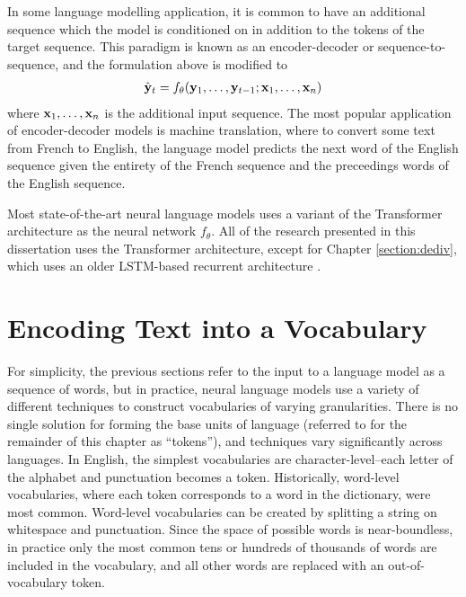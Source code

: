 In some language modelling application, it is common to have an additional sequence which the model is conditioned on in addition to the tokens of the target sequence.
This paradigm is known as an encoder-decoder or sequence-to-sequence, and the formulation above is modified to
\begin{align}
    \hat{\mathbf{y}}_t = f_\theta(\mathbf{y}_1, \ldots, \mathbf{y}_{t-1}; \mathbf{x}_1, \ldots, \mathbf{x}_n)
    \label{eq:cond_lm_feq}
\end{align}
where $\mathbf{x}_1, \ldots, \mathbf{x}_n$ is the additional input sequence. 
The most popular application of encoder-decoder models is machine translation, where to convert some text from French to English, the language model predicts the next word of the English sequence given the entirety of the French sequence and the preceedings words of the English sequence.

Most state-of-the-art neural language models uses a variant of the Transformer architecture \cite{vaswani2017attention} as the neural network $f_\theta$.
All of the research presented in this dissertation uses the Transformer architecture, except for Chapter \ref{section:dediv}, which uses an older LSTM-based recurrent architecture \citep{hochreiter1997long}.

\section{Encoding Text into a Vocabulary}

For simplicity, the previous sections refer to the input to a language model as a sequence of words, but in practice, neural language models use a variety of different techniques to construct vocabularies of varying granularities.
There is no single solution for forming the base units of language (referred to for the remainder of this chapter as ``tokens''), and techniques vary significantly across languages.
In English, the simplest vocabularies are character-level--each letter of the alphabet and punctuation becomes a token.
Historically, word-level vocabularies, where each token corresponds to a word in the dictionary, were most common.
Word-level vocabularies can be created by splitting a string on whitespace and punctuation.
Since the space of possible words is near-boundless, in practice only the most common tens or hundreds of thousands of words are included in the vocabulary, and all other words are replaced with an out-of-vocabulary token.

